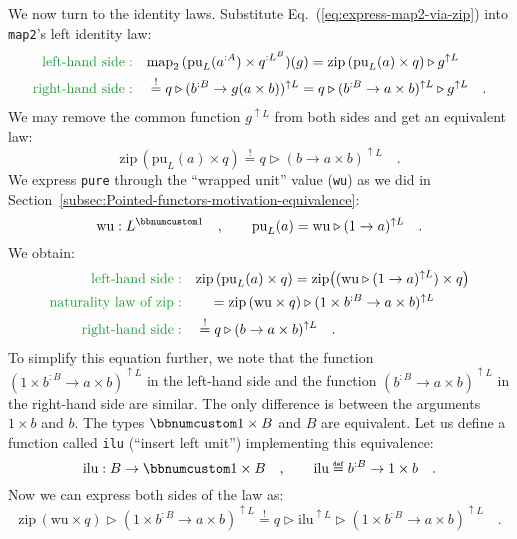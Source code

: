 We now turn to the identity laws. Substitute Eq.~(\ref{eq:express-map2-via-zip})
into \lstinline!map2!\textsf{'}s left identity law:
\begin{align*}
{\color{greenunder}\text{left-hand side}:}\quad & \text{map}_{2}\,(\text{pu}_{L}(a^{:A})\times q^{:L^{B}})(g)=\text{zip}\,(\text{pu}_{L}(a)\times q)\triangleright g^{\uparrow L}\\
{\color{greenunder}\text{right-hand side}:}\quad & \overset{!}{=}q\triangleright(b^{:B}\rightarrow g(a\times b))^{\uparrow L}=q\triangleright(b^{:B}\rightarrow a\times b)^{\uparrow L}\triangleright g^{\uparrow L}\quad.
\end{align*}
We may remove the common function $g^{\uparrow L}$ from both sides
and get an equivalent law:
\[
\text{zip}\,(\text{pu}_{L}(a)\times q)\overset{!}{=}q\triangleright(b\rightarrow a\times b)^{\uparrow L}\quad.
\]
We express \lstinline!pure! through the \textsf{``}wrapped unit\textsf{''} value
(\lstinline!wu!) as we did in Section~\ref{subsec:Pointed-functors-motivation-equivalence}:
\[
\text{wu}:L^{\bbnum 1}\quad,\quad\quad\text{pu}_{L}(a)=\text{wu}\triangleright(1\rightarrow a)^{\uparrow L}\quad.
\]
We obtain:
\begin{align*}
{\color{greenunder}\text{left-hand side}:}\quad & \text{zip}\,(\text{pu}_{L}(a)\times q)=\text{zip}\big((\text{wu}\triangleright(1\rightarrow a)^{\uparrow L})\times q\big)\\
{\color{greenunder}\text{naturality law of }\text{zip}:}\quad & \quad=\text{zip}\,(\text{wu}\times q)\triangleright(1\times b^{:B}\rightarrow a\times b)^{\uparrow L}\\
{\color{greenunder}\text{right-hand side}:}\quad & \overset{!}{=}q\triangleright(b\rightarrow a\times b)^{\uparrow L}\quad.
\end{align*}
To simplify this equation further, we note that the function $(1\times b^{:B}\rightarrow a\times b)^{\uparrow L}$
in the left-hand side and the function $(b^{:B}\rightarrow a\times b)^{\uparrow L}$
in the right-hand side are similar. The only difference is between
the arguments $1\times b$ and $b$. The types $\bbnum 1\times B$
and $B$ are equivalent. Let us define a function called \lstinline!ilu!
(\textsf{``}insert left unit\textsf{''}) implementing this equivalence:
\[
\text{ilu}:B\rightarrow\bbnum 1\times B\quad,\quad\quad\text{ilu}\triangleq b^{:B}\rightarrow1\times b\quad.
\]
Now we can express both sides of the law as:
\begin{equation}
\text{zip}\,(\text{wu}\times q)\triangleright(1\times b^{:B}\rightarrow a\times b)^{\uparrow L}\overset{!}{=}q\triangleright\text{ilu}^{\uparrow L}\triangleright(1\times b^{:B}\rightarrow a\times b)^{\uparrow L}\quad.\label{eq:left-identity-zip-derivation1}
\end{equation}
